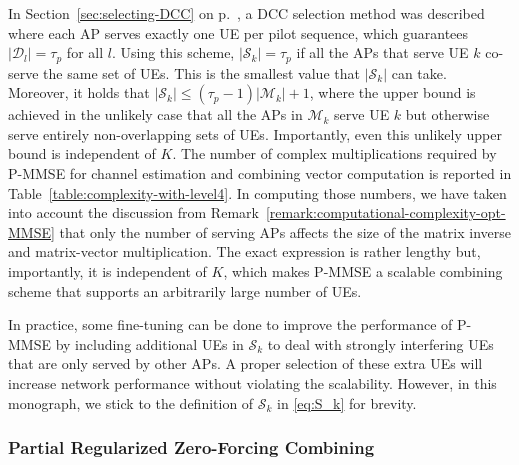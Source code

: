 In Section~\ref{sec:selecting-DCC} on p.~\pageref{sec:selecting-DCC}, a DCC selection method was described where each AP serves exactly one UE per pilot sequence, which guarantees $|\mathcal{D}_l| = \tau_p$ for all $l$. Using this scheme, $|\mathcal{S}_k|=\tau_p$ if all the APs that serve UE $k$ co-serve the same set of UEs. This is the smallest value that $|\mathcal{S}_k|$ can take.
 Moreover, it holds that $|\mathcal{S}_k| \leq (\tau_p-1) |\mathcal{M}_k|+1$, where the upper bound is achieved in the unlikely case that all the APs in $\mathcal{M}_k$ serve UE $k$ but otherwise serve entirely non-overlapping sets of UEs. Importantly, even this unlikely upper bound is independent of $K$.
The number of complex multiplications required by P-MMSE for channel estimation and combining vector computation is reported in Table~\ref{table:complexity-with-level4}. In computing those numbers, we have taken into account the discussion from Remark~\ref{remark:computational-complexity-opt-MMSE} that only the number of serving APs affects the size of the matrix inverse and matrix-vector multiplication. The exact expression is rather lengthy but, importantly, it is independent of $K$, which makes P-MMSE a scalable combining scheme that supports an arbitrarily large number of UEs. 

In practice, some fine-tuning can be done to improve the performance of P-MMSE by including additional UEs in $\mathcal{S}_k$ to deal with strongly interfering UEs that are only served by other APs. A proper selection of these extra UEs will increase network performance without violating the scalability. However, in this monograph, we stick to the definition of $\mathcal{S}_k$ in \eqref{eq:S_k} for brevity.




\subsubsection{Partial Regularized Zero-Forcing Combining}

